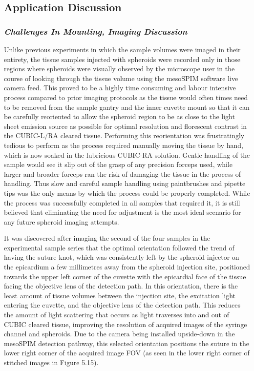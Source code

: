 \subsection{Application Discussion}
\subsubsection{\textit{Challenges In Mounting, Imaging Discussion}}

Unlike previous experiments in which the sample volumes were imaged in their entirety, the tissue samples injected with spheroids were recorded only in those regions where spheroids were visually observed by the microscope user in the course of looking through the tissue volume using the mesoSPIM software live camera feed. This proved to be a highly time consuming and labour intensive process compared to prior imaging protocols as the tissue would often times need to be removed from the sample gantry and the inner cuvette mount so that it can be carefully reoriented to allow the spheroid region to be as close to the light sheet emission source as possible for optimal resolution and florescent contrast in the CUBIC-L/RA cleared tissue. Performing this reorientation was frustratingly tedious to perform as the process required manually moving the tissue by hand, which is now soaked in the lubricious CUBIC-RA solution. Gentle handling of the sample would see it slip out of the grasp of any precision forceps used, while larger and broader forceps ran the risk of damaging the tissue in the process of handling. Thus slow and careful sample handling using paintbrushes and pipette tips was the only means by which the process could be properly completed. While the process was successfully completed in all samples that required it, it is still believed that eliminating the need for adjustment is the most ideal scenario for any future spheroid imaging attempts.

It was discovered after imaging the second of the four samples in the experimental sample series that the optimal orientation followed the trend of having the suture knot, which was consistently left by the spheroid injector on the epicardium a few millimetres away from the spheroid injection site, positioned towards the upper left corner of the cuvette with the epicardial face of the tissue facing the objective lens of the detection path. In this orientation, there is the least amount of tissue volumes between the injection site, the excitation light entering the cuvette, and the objective lens of the detection path. This reduces the amount of light scattering that occurs as light traverses into and out of CUBIC cleared tissue, improving the resolution of acquired images of the syringe channel and spheroids. Due to the camera being installed upside-down in the mesoSPIM detection pathway, this selected orientation positions the suture in the lower right corner of the acquired image FOV (as seen in the lower right corner of stitched images in Figure 5.15). 


